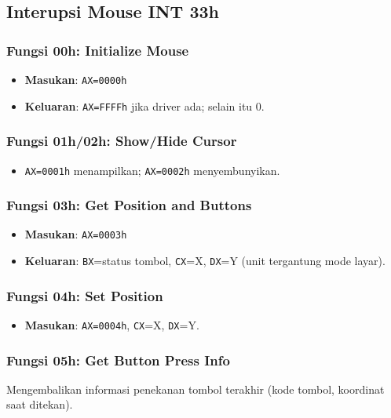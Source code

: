 \subsection{Interupsi Mouse INT 33h}
\subsubsection{Fungsi 00h: Initialize Mouse}
\begin{itemize}
  \item \textbf{Masukan}: \texttt{AX=0000h}
  \item \textbf{Keluaran}: \texttt{AX=FFFFh} jika driver ada; selain itu 0.
\end{itemize}

\subsubsection{Fungsi 01h/02h: Show/Hide Cursor}
\begin{itemize}
  \item \texttt{AX=0001h} menampilkan; \texttt{AX=0002h} menyembunyikan.
\end{itemize}

\subsubsection{Fungsi 03h: Get Position and Buttons}
\begin{itemize}
  \item \textbf{Masukan}: \texttt{AX=0003h}
  \item \textbf{Keluaran}: \texttt{BX}=status tombol, \texttt{CX}=X, \texttt{DX}=Y (unit tergantung mode layar).
\end{itemize}

\subsubsection{Fungsi 04h: Set Position}
\begin{itemize}
  \item \textbf{Masukan}: \texttt{AX=0004h}, \texttt{CX}=X, \texttt{DX}=Y.
\end{itemize}

\subsubsection{Fungsi 05h: Get Button Press Info}
Mengembalikan informasi penekanan tombol terakhir (kode tombol, koordinat saat ditekan).

